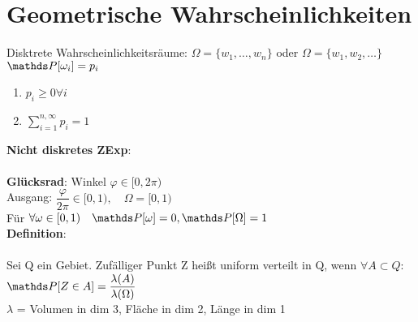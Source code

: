 \chapter{Geometrische Wahrscheinlichkeiten}
Disktrete Wahrscheinlichkeitsräume: $\Omega = \{w_1,\dots,w_n\}$ oder $\Omega = \{w_1,w_2,\dots\}$\smallskip\\
$\PP[\omega_i]=p_i$
\begin{enumerate}
	\item $p_i \geq 0 \forall i$
	\item $\sum_{i=1}^{n,\infty}p_i = 1$
\end{enumerate}
\textbf{Nicht diskretes ZExp}:\\
\smallskip\\
\textbf{Glücksrad}: Winkel $\varphi\in[0,2\pi)$\\
Ausgang: $\dfrac{\varphi}{2\pi}\in[0,1), \quad \Omega =[0,1)$\medskip\\
Für $\forall \omega \in [0,1) \quad \PP[\omega]=0, \PP[\Omega] = 1$\medskip\\
\textbf{Definition}:\\
\smallskip\\
Sei Q ein Gebiet. Zufälliger Punkt Z heißt uniform verteilt in Q, wenn $\forall A \subset Q:$\smallskip\\
$\PP[Z \in A] = \dfrac{\lambda(A)}{\lambda(\Omega)}$\smallskip\\
$\lambda$ = Volumen in dim 3, Fläche in dim 2, Länge in dim 1\\
\medskip\\

